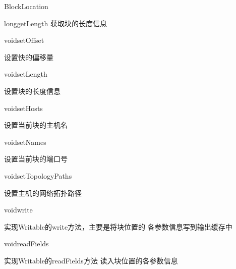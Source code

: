 \begin{XeClass}{BlockLocation}
\begin{XeMethod}{\XePublic}{long}{getLength}
 获取块的长度信息

    \end{XeMethod}

    \begin{XeMethod}{\XePublic}{void}{setOffset}
         
 设置快的偏移量

    \end{XeMethod}

    \begin{XeMethod}{\XePublic}{void}{setLength}
         
 设置块的长度信息

    \end{XeMethod}

    \begin{XeMethod}{\XePublic}{void}{setHosts}
         
 设置当前块的主机名

    \end{XeMethod}

    \begin{XeMethod}{\XePublic}{void}{setNames}
         
 设置当前块的端口号

    \end{XeMethod}

    \begin{XeMethod}{\XePublic}{void}{setTopologyPaths}
         
 设置主机的网络拓扑路径

    \end{XeMethod}

    \begin{XeMethod}{\XePublic}{void}{write}
         
 实现Writable的write方法，主要是将块位置的
 各参数信息写到输出缓存中

    \end{XeMethod}

    \begin{XeMethod}{\XePublic}{void}{readFields}
         
 实现Writable的readFields方法
 读入块位置的各参数信息

    \end{XeMethod}

\end{XeClass}
